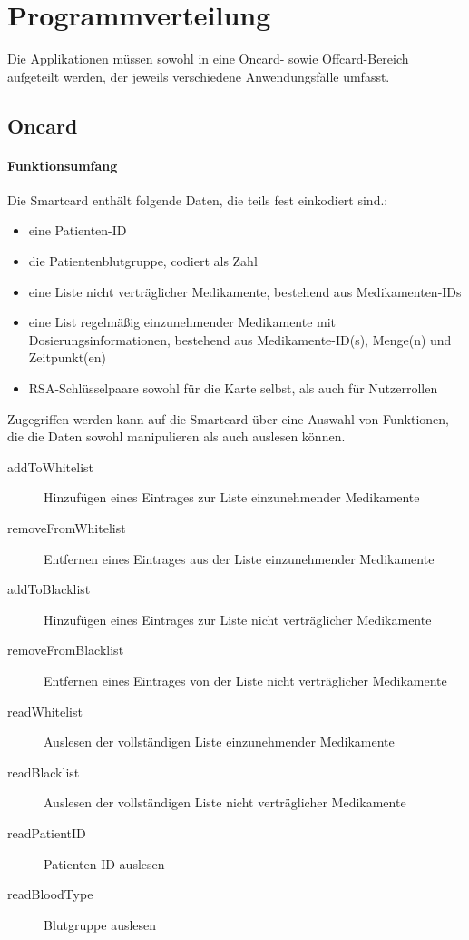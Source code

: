 \documentclass[parskip]{scrartcl}
\begin{document}
	\section{Programmverteilung}
		Die Applikationen müssen sowohl in eine Oncard- sowie Offcard-Bereich aufgeteilt werden, der jeweils verschiedene Anwendungsfälle umfasst.

		\subsection{Oncard}
		
			\paragraph{Funktionsumfang}
			Die Smartcard enthält folgende Daten, die teils fest einkodiert sind.:
			
			\begin{itemize}
				\item eine Patienten-ID
				\item die Patientenblutgruppe, codiert als Zahl
				\item eine Liste nicht verträglicher Medikamente, bestehend aus Medikamenten-IDs
				\item eine List regelmäßig einzunehmender Medikamente mit Dosierungsinformationen, bestehend aus Medikamente-ID(s), Menge(n) und Zeitpunkt(en)
				\item RSA-Schlüsselpaare sowohl für die Karte selbst, als auch für Nutzerrollen
			\end{itemize}
		
			Zugegriffen werden kann auf die Smartcard über eine Auswahl von Funktionen, die die Daten sowohl manipulieren als auch auslesen können.
			
			\begin{description}
				\item[addToWhitelist] Hinzufügen eines Eintrages zur Liste einzunehmender Medikamente
				\item[removeFromWhitelist] Entfernen eines Eintrages aus der Liste einzunehmender Medikamente
				\item[addToBlacklist] Hinzufügen eines Eintrages zur Liste nicht verträglicher Medikamente
				\item[removeFromBlacklist] Entfernen eines Eintrages von der Liste nicht verträglicher Medikamente
				\item[readWhitelist] Auslesen der vollständigen Liste einzunehmender Medikamente
				\item[readBlacklist] Auslesen der vollständigen Liste nicht verträglicher Medikamente
				\item[readPatientID] Patienten-ID auslesen
				\item[readBloodType] Blutgruppe auslesen
			\end{description}
			
\end{document}
